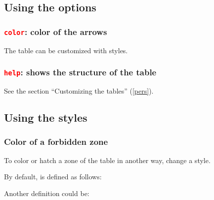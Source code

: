 \subsection{Using the options}

\subsubsection{\texttt{\textcolor{red}{color}}: color of the arrows}
The table can be customized with styles.
\begin{tkzexample}
\end{tkzexample}

\subsubsection{\texttt{\textcolor{red}{help}}: shows the structure of the table}
See the section ``Customizing the tables'' (\ref{pers}).
\subsection{Using the styles}

\subsubsection{Color of a forbidden zone}
To color or hatch a zone of the table in another way, change a style.

By default,  is defined as follows:
\begin{tkzexample}
\end{tkzexample}

Another definition could be:

\begin{tkzexample}
\end{tkzexample}

\begin{tkzexample}[vbox,width=9cm]
\end{tkzexample}

